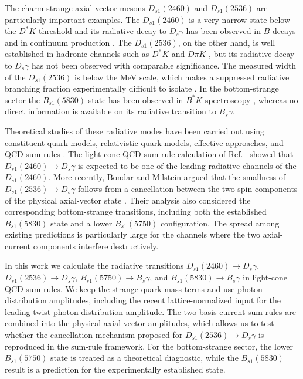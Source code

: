 \documentclass[aps,prd,preprint,nofootinbib,superscriptaddress]{revtex4-2}
\newcommand{\Ds}{D_s}
\newcommand{\Dsone}{D_{s1}}
\newcommand{\Bs}{B_s}
\newcommand{\Bsone}{B_{s1}}
\begin{document}
The charm-strange axial-vector mesons $\Dsone(2460)$ and $\Dsone(2536)$ are
particularly important examples.  The $\Dsone(2460)$ is a very narrow state
below the $D^{\ast}K$ threshold and its radiative decay to $\Ds\gamma$ has
been observed in $B$ decays and in continuum production
\cite{BaBar:2004zjt,BaBar:2006eep}.  The $\Dsone(2536)$, on the other hand,
is well established in hadronic channels such as $D^{\ast}K$ and
$D\pi K$ \cite{Belle:2007hue,BaBar:2011zpy}, but its radiative decay to
$\Ds\gamma$ has not been observed with comparable significance.  The measured
width of the $\Dsone(2536)$ is below the MeV scale, which makes a suppressed
radiative branching fraction experimentally difficult to isolate
\cite{BaBar:2011zpy}.  In the bottom-strange sector the
$\Bsone(5830)$ state has been observed in $B^{\ast}K$ spectroscopy
\cite{LHCb:2012kxf,CMS:2018qdl}, whereas no direct information is available
on its radiative transition to $\Bs\gamma$.

Theoretical studies of these radiative modes have been carried out using
constituent quark models, relativistic quark models, effective approaches,
and QCD sum rules
\cite{Goity:2000dk,Godfrey:2005ww,Colangelo:2005hv,Radford:2009bs,
Godfrey:2016nwn,Lu:2016bbk,Green:2016occ,Chen:2020ejk,Li:2021qgz,
Pullin:2021ebn,Bondar:2023mua,Bondar:2025smw}.  The light-cone QCD sum-rule
calculation of Ref.~\cite{Colangelo:2005hv} showed that
$\Dsone(2460)\to\Ds\gamma$ is expected to be one of the leading radiative
channels of the $\Dsone(2460)$.  More recently, Bondar and Milstein argued
that the smallness of $\Dsone(2536)\to\Ds\gamma$ follows from a cancellation
between the two spin components of the physical axial-vector state
\cite{Bondar:2023mua,Bondar:2025smw}.  Their analysis also considered the
corresponding bottom-strange transitions, including both the established
$\Bsone(5830)$ state and a lower \(\Bsone(5750)\) configuration.
The spread among existing predictions is particularly large for the channels
where the two axial-current components interfere destructively.

In this work we calculate the radiative transitions
$\Dsone(2460)\to\Ds\gamma$, $\Dsone(2536)\to\Ds\gamma$,
$\Bsone(5750)\to\Bs\gamma$, and $\Bsone(5830)\to\Bs\gamma$
in light-cone QCD sum rules.  We keep the strange-quark-mass terms and use
photon distribution amplitudes, including the recent lattice-normalized input
for the leading-twist photon distribution amplitude.  The two basis-current
sum rules are combined into the physical axial-vector amplitudes, which allows
us to test whether the cancellation mechanism proposed for
$\Dsone(2536)\to\Ds\gamma$ is reproduced in the sum-rule framework.  For the
bottom-strange sector, the lower \(\Bsone(5750)\) state is treated as a
theoretical diagnostic, while the $\Bsone(5830)$ result is a prediction for
the experimentally established state.
\end{document}
